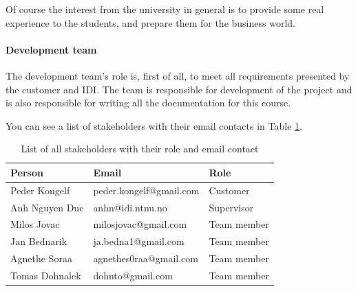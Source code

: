 Of course the interest from the university in general is to provide some real experience to the students, and prepare them for the business world.

\paragraph{Development team}
The development team's role is, first of all, to meet all requirements presented by the customer and IDI. 
The team is responsible for development of the project and is also responsible for writing all the documentation for this course.  



You can see a list of stakeholders with their email contacts in Table \ref{tab:stakeholders_summary}.

\begin{table}[!ht]\centering
\caption{List of all stakeholders with their role and email contact}
\label{tab:stakeholders_summary}
\def\arraystretch{1.3}
\begin{tabular}{lll}
\toprule[0.5mm]
\textbf{Person} & \textbf{Email} & \textbf{Role}\\
\midrule
Peder Kongelf & peder.kongelf@gmail.com  & Customer\\
\midrule
Anh Nguyen Duc	 & anhn@idi.ntnu.no & Supervisor \\
\midrule
Milos Jovac &  milosjovac@gmail.com & Team member  \\
Jan Bednarik &  ja.bedna1@gmail.com & Team member\\
Agnethe Soraa & agnethes0raa@gmail.com & Team member  \\
Tomas Dohnalek & dohnto@gmail.com & Team member \\
\bottomrule[0.5mm]
\end{tabular}
\end{table}


